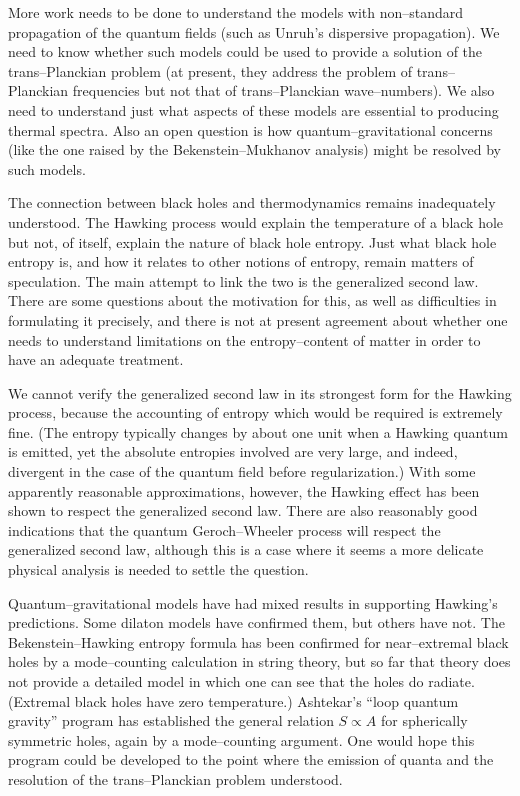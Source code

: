 More work needs to be done to understand the models with non--standard
propagation of the quantum fields (such as Unruh's dispersive propagation).  We
need to know whether such models could be used to provide a solution of the
trans--Planckian problem (at present, they address the problem of
trans--Planckian frequencies but not that of trans--Planckian wave--numbers). 
We also need to understand just what aspects of these models are essential to
producing thermal spectra.  Also an open question is how quantum--gravitational
concerns (like the one raised by the Bekenstein--Mukhanov analysis) might be
resolved by such models.

The connection between black holes and thermodynamics remains inadequately
understood.   The Hawking process would explain the temperature of a black hole
but not, of itself, explain the nature of black hole entropy. Just what black
hole entropy is, and how it relates to other notions of entropy, remain
matters of speculation.  The main attempt to link the two is
the generalized second law.  There are some questions about the motivation for
this, as well as difficulties in formulating it precisely, and there is not at
present agreement about whether one needs to understand limitations on the
entropy--content of matter in order to have an adequate treatment.

We cannot verify the generalized second law in its strongest form for the
Hawking process, because the accounting of entropy which would be required is
extremely fine. (The entropy typically changes by about one unit when a Hawking
quantum is emitted, yet the absolute entropies involved are very large, and
indeed, divergent in the case of the quantum field before regularization.) With
some apparently reasonable approximations, however, the Hawking effect has been
shown to respect the generalized second law.  There are also reasonably good
indications that the quantum Geroch--Wheeler process will respect the
generalized second law, although this is a case where it seems a more delicate
physical analysis is needed to settle the question.

Quantum--gravitational models have had mixed results in supporting Hawking's
predictions.  Some dilaton models have confirmed them, but others have not. 
The Bekenstein--Hawking entropy formula has been confirmed for near--extremal
black holes by a mode--counting calculation in string theory, but so far that
theory does not provide a detailed model in which one can see that the holes do
radiate.   (Extremal black holes have zero temperature.) Ashtekar's ``loop
quantum gravity'' program has established the general relation $S\propto A$ for
spherically symmetric holes, again by a mode--counting argument.  One would
hope this program could be developed to the point where the emission of quanta
and the resolution of the trans--Planckian problem understood.

